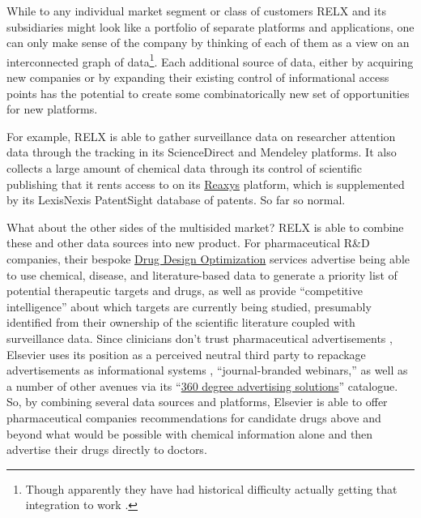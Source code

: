 While to any individual market segment or class of customers RELX and
its subsidiaries might look like a portfolio of separate platforms and
applications, one can only make sense of the company by thinking of each
of them as a view on an interconnected graph of data\footnote{Though
  apparently they have had historical difficulty actually getting that
  integration to work \cite{schonfeldReorganizationElsevier2022} .}. Each additional source of data, either by acquiring new
companies or by expanding their existing control of informational access
points has the potential to create some combinatorically new set of
opportunities for new platforms.

For example, RELX is able to gather surveillance data on researcher
attention data through the tracking in its ScienceDirect and Mendeley
platforms. It also collects a large amount of chemical data through its
control of scientific publishing that it rents access to on its
\href{https://www.elsevier.com/en-gb/solutions/reaxys}{Reaxys} platform,
which is supplemented by its LexisNexis PatentSight database of patents.
So far so normal.

What about the other sides of the multisided market? RELX is able to
combine these and other data sources into new product. For
pharmaceutical R\&D companies, their bespoke
\href{https://web.archive.org/web/20211207070524/https://www.elsevier.com/solutions/professional-services/drug-design-optimization}{Drug
Design Optimization} services advertise being able to use chemical,
disease, and literature-based data to generate a priority list of
potential therapeutic targets and drugs, as well as provide
``competitive intelligence'' about which targets are currently being
studied, presumably identified from their ownership of the scientific
literature coupled with surveillance data. Since clinicians don't trust
pharmaceutical advertisements \cite{elsevierMakingMedicalInformation2021} , Elsevier uses its position as
a perceived neutral third party to repackage advertisements as
informational systems \cite{elsevierRethinkClincalContent2020} ,
``journal-branded webinars,'' as well as a number of other avenues via
its
``\href{https://web.archive.org/web/20211111211058/https://www.elsevier.com/advertising-reprints-supplements/advertising}{360
degree advertising solutions}'' catalogue. So, by combining several data
sources and platforms, Elsevier is able to offer pharmaceutical
companies recommendations for candidate drugs above and beyond what
would be possible with chemical information alone and then advertise
their drugs directly to doctors.

